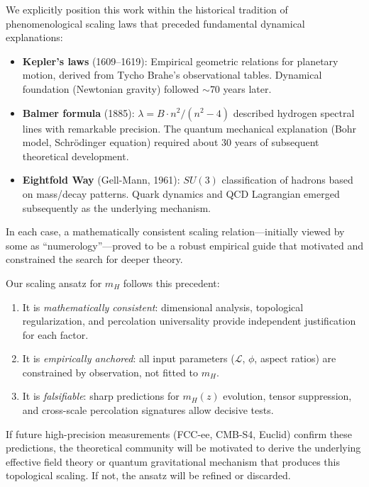 \documentclass[11pt,a4paper]{article}
\newcommand{\Ltop}{\ensuremath{\mathcal{L}}}
\begin{document}
We explicitly position this work within the historical tradition of phenomenological 
scaling laws that preceded fundamental dynamical explanations:

\begin{itemize}
    \item \textbf{Kepler's laws} (1609--1619): Empirical geometric relations for 
    planetary motion, derived from Tycho Brahe's observational tables. 
    Dynamical foundation (Newtonian gravity) followed $\sim$70 years later.
    
    \item \textbf{Balmer formula} (1885): $\lambda = B \cdot n^2/(n^2-4)$ described 
    hydrogen spectral lines with remarkable precision. The quantum mechanical 
    explanation (Bohr model, Schr\"odinger equation) required about 30 years of 
    subsequent theoretical development.
    
    \item \textbf{Eightfold Way} (Gell-Mann, 1961): $SU(3)$ classification of hadrons 
    based on mass/decay patterns. Quark dynamics and QCD Lagrangian emerged 
    subsequently as the underlying mechanism.
\end{itemize}

In each case, a mathematically consistent scaling relation---initially viewed by 
some as ``numerology''---proved to be a robust empirical guide that motivated 
and constrained the search for deeper theory.

Our scaling ansatz for $m_H$ follows this precedent:
\begin{enumerate}
    \item It is \textit{mathematically consistent}: dimensional analysis, 
    topological regularization, and percolation universality provide independent 
    justification for each factor.
    
    \item It is \textit{empirically anchored}: all input parameters ($\Ltop$, 
    $\phi$, aspect ratios) are constrained by observation, not fitted to $m_H$.
    
    \item It is \textit{falsifiable}: sharp predictions for $m_H(z)$ evolution, 
    tensor suppression, and cross-scale percolation signatures allow decisive tests.
\end{enumerate}

If future high-precision measurements (FCC-ee, CMB-S4, Euclid) confirm these 
predictions, the theoretical community will be motivated to derive the underlying 
effective field theory or quantum gravitational mechanism that produces this 
topological scaling. If not, the ansatz will be refined or discarded. 
\end{document}

